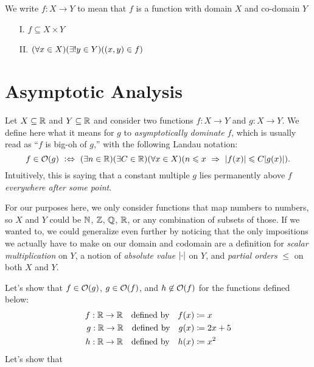 \begin{definition}[Function]
    We write $f: X \to Y$ to mean that $f$ is a function with domain $X$ and co-domain $Y$ \iffbydefn
    \begin{enumerate}
        \item[I.]
            $f \subseteq X \times Y$
        \item[II.]
            $\pn*{\forall x \in X}\pn*{\exists ! y \in Y}\pn*{(x, y) \in f}$
    \end{enumerate}
\end{definition}

\section{Asymptotic Analysis}
\begin{definition}
    Let $X \subseteq \mathbb{R}$ and $Y \subseteq \mathbb{R}$ and consider two functions $f: X \to Y$ and $g: X \to Y$.
    We define here what it means for $g$ to \emph{asymptotically dominate} $f$,
    which is usually read as ``$f$ is big-oh of $g$,''
    with the following Landau notation:
    \[
        f \in \O{g} \iffdefn \pn*{\exists n \in \R}\pn*{\exists C \in \R}\pn*{\forall x \in X}
                             \pn*{n \leq x \implies \abs{f(x)} \leq C \abs{g(x)}}.
    \]
    Intuitively, this is saying that a constant multiple $g$ lies permanently above $f$
    \emph{everywhere after some point}.

    For our purposes here, we only consider functions that map numbers to numbers,
    so $X$ and $Y$ could be $\mathbb{N}$, $\mathbb{Z}$, $\mathbb{Q}$, $\mathbb{R}$, or any combination of subsets of those.
    If we wanted to, we could generalize even further by noticing that
    the only impositions we actually have to make on our domain and codomain are
    a definition for \emph{scalar multiplication} on $Y$,
    a notion of \emph{absolute value} $\lvert\cdot\rvert$ on $Y$,
    and \emph{partial orders} $\leq$ on both $X$ and $Y$.
\end{definition}

\begin{example}
    Let's show that $f \in \O{g}$, $g \in \O{f}$, and $h \not \in \O{f}$ for the functions defined below:
    \begin{align*}
        f: \mathbb{R} \to \mathbb{R}~~\text{ defined by }~~f(x) &\coloneqq x\\
        g: \mathbb{R} \to \mathbb{R}~~\text{ defined by }~~g(x) &\coloneqq 2x + 5\\
        h: \mathbb{R} \to \mathbb{R}~~\text{ defined by }~~h(x) &\coloneqq x^2
    \end{align*}
    Let's show that
\end{example}


